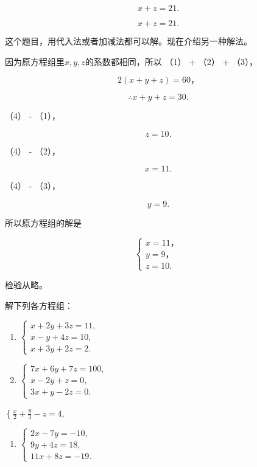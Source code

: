 \[
x + z = 21. \tag{2}
\]

\[
x + z = 21. \tag{3}
\]

这个题目，用代入法或者加减法都可以解。现在介绍另一种解法。

 因为原方程组里\(x, y, z\)的系数都相同，所以 （1） +
（2） + （3），

\[
2 (x + y + z) = 60\text{，}
\]

\[
\therefore x + y + z = 30. \tag{4}
\]

（4） - （1），

\[
z = 10.
\]

（4） - （2），

\[
x = 11.
\]

（4） - （3），

\[
y = 9.
\]

所以原方程组的解是

\[
\left\{ \begin{array}{l} x = 11\text{，} \\ y = 9\text{，} \\ z = 10. \end{array} \right.
\]

检验从略。

解下列各方程组：

\begin{enumerate}[start=1]
\item
  \(\left\{ \begin{array}{l} x + 2y + 3z = 11, \\ x - y + 4z = 10, \\ x + 3y + 2z = 2. \end{array} \right.\)
\item
  \(\left\{ \begin{array}{l} 7x + 6y + 7z = 100, \\ x - 2y + z = 0, \\ 3x + y - 2z = 0. \end{array} \right.\)
\end{enumerate}

\(\left\{\frac{x}{2} + \frac{y}{3} - z = 4, \right.\)

\begin{enumerate}[start=4]
\item
  \(\left\{ \begin{array}{l} 2x - 7y = -10, \\ 9y + 4z = 18, \\ 11x + 8z = -19. \end{array} \right.\)
\end{enumerate}

